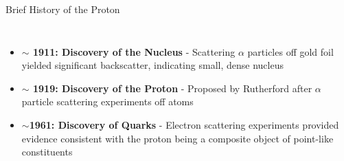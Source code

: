 \documentclass[aspectratio=169]{beamer}
\newcommand*{\myfont}{\fontfamily{lmtt}\selectfont}
\begin{document}
\begin{frame}{Brief History of the Proton}


   \begin{columns}
        
              \begin{itemize}
                    \setlength\itemsep{1em}
                    \item  \textbf{$\sim$ 1911: Discovery of the Nucleus} - Scattering $\alpha$ particles off gold foil yielded significant backscatter, indicating small, dense nucleus  {\myfont{\tiny  [Wikipedia:Geiger-Marsden]   }}
                    \item \textbf{$\sim$ 1919: Discovery of the Proton} - Proposed by Rutherford after $\alpha$ particle scattering experiments off atoms {\myfont{\tiny  [E. Rutherford doi:10.1080/14786431003659230]   }}
                    \item \textbf{$\sim$1961: Discovery of Quarks} - Electron scattering experiments provided evidence consistent with the proton being a composite object of point-like constituents 
                    \end{itemize}


\end{columns}
\end{frame}
\end{document}
